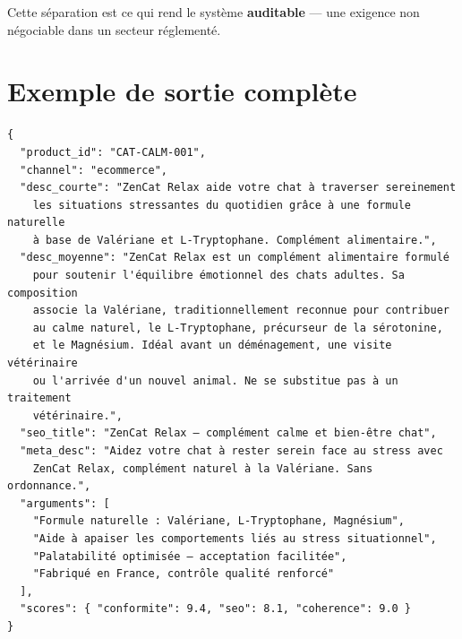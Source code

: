 \documentclass[11pt,a4paper]{article}
\begin{document}
Cette séparation est ce qui rend le système \textbf{auditable} — une exigence non négociable
dans un secteur réglementé.

\appendix
\section{Exemple de sortie complète}

\begin{lstlisting}[caption={ContentSet — ZenCat Relax, canal e-commerce}]
{
  "product_id": "CAT-CALM-001",
  "channel": "ecommerce",
  "desc_courte": "ZenCat Relax aide votre chat à traverser sereinement
    les situations stressantes du quotidien grâce à une formule naturelle
    à base de Valériane et L-Tryptophane. Complément alimentaire.",
  "desc_moyenne": "ZenCat Relax est un complément alimentaire formulé
    pour soutenir l'équilibre émotionnel des chats adultes. Sa composition
    associe la Valériane, traditionnellement reconnue pour contribuer
    au calme naturel, le L-Tryptophane, précurseur de la sérotonine,
    et le Magnésium. Idéal avant un déménagement, une visite vétérinaire
    ou l'arrivée d'un nouvel animal. Ne se substitue pas à un traitement
    vétérinaire.",
  "seo_title": "ZenCat Relax — complément calme et bien-être chat",
  "meta_desc": "Aidez votre chat à rester serein face au stress avec
    ZenCat Relax, complément naturel à la Valériane. Sans ordonnance.",
  "arguments": [
    "Formule naturelle : Valériane, L-Tryptophane, Magnésium",
    "Aide à apaiser les comportements liés au stress situationnel",
    "Palatabilité optimisée — acceptation facilitée",
    "Fabriqué en France, contrôle qualité renforcé"
  ],
  "scores": { "conformite": 9.4, "seo": 8.1, "coherence": 9.0 }
}
\end{lstlisting}
\end{document}
